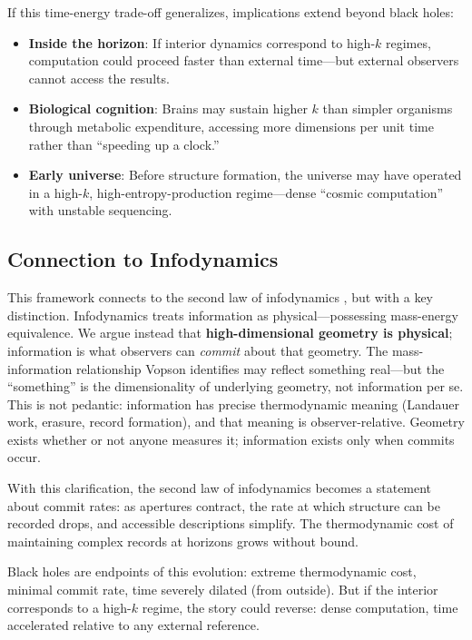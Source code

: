 \documentclass[11pt,a4paper]{article}
\begin{document}
If this time-energy trade-off generalizes, implications extend beyond black holes:
\begin{itemize}
    \item \textbf{Inside the horizon}: If interior dynamics correspond to high-$k$ regimes, computation could proceed faster than external time---but external observers cannot access the results.
    \item \textbf{Biological cognition}: Brains may sustain higher $k$ than simpler organisms through metabolic expenditure, accessing more dimensions per unit time rather than ``speeding up a clock.''
    \item \textbf{Early universe}: Before structure formation, the universe may have operated in a high-$k$, high-entropy-production regime---dense ``cosmic computation'' with unstable sequencing.
\end{itemize}

\subsection{Connection to Infodynamics}

This framework connects to the second law of infodynamics \cite{vopson2023}, but with a key distinction. Infodynamics treats information as physical---possessing mass-energy equivalence. We argue instead that \textbf{high-dimensional geometry is physical}; information is what observers can \emph{commit} about that geometry. The mass-information relationship Vopson identifies may reflect something real---but the ``something'' is the dimensionality of underlying geometry, not information per se. This is not pedantic: information has precise thermodynamic meaning (Landauer work, erasure, record formation), and that meaning is observer-relative. Geometry exists whether or not anyone measures it; information exists only when commits occur.

With this clarification, the second law of infodynamics becomes a statement about commit rates: as apertures contract, the rate at which structure can be recorded drops, and accessible descriptions simplify. The thermodynamic cost of maintaining complex records at horizons grows without bound.

Black holes are endpoints of this evolution: extreme thermodynamic cost, minimal commit rate, time severely dilated (from outside). But if the interior corresponds to a high-$k$ regime, the story could reverse: dense computation, time accelerated relative to any external reference.
\end{document}
